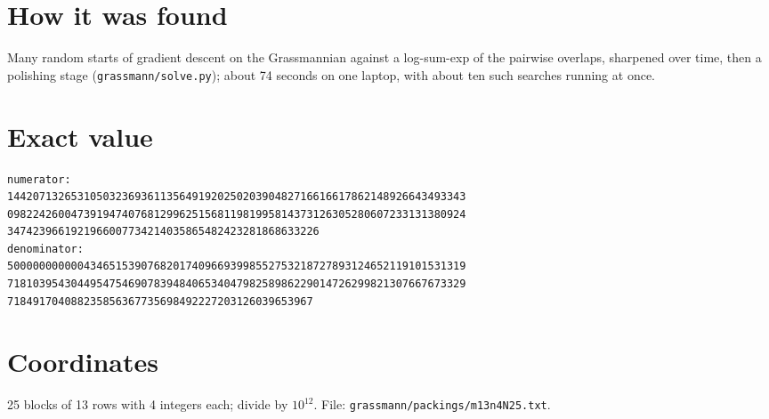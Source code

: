 \documentclass[11pt,a4paper]{article}
\begin{document}
\section{How it was found}
Many random starts of gradient descent on the Grassmannian against a log-sum-exp of the pairwise overlaps, sharpened over time, then a polishing stage (\texttt{grassmann/solve.py}); about 74 seconds on one laptop, with about ten such searches running at once.


\appendix
\section{Exact value}
{\small
\begin{verbatim}
numerator:
144207132653105032369361135649192025020390482716616617862148926643493343
098224260047391947407681299625156811981995814373126305280607233131380924
3474239661921966007734214035865482423281868633226
denominator:
500000000000434651539076820174096693998552753218727893124652119101531319
718103954304495475469078394840653404798258986229014726299821307667673329
718491704088235856367735698492227203126039653967
\end{verbatim}}

\section{Coordinates}
25 blocks of 13 rows with 4 integers each; divide by $10^{12}$. File: \texttt{grassmann/packings/m13n4N25.txt}.
{\tiny
\begin{multicols}{3}
\end{multicols}}
\end{document}

